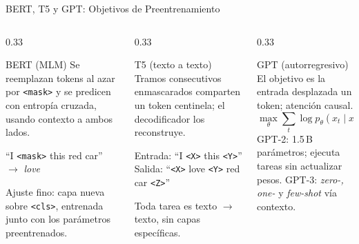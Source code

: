 \documentclass[aspectratio=169, 10pt]{beamer}
\begin{document}
\begin{frame}{BERT, T5 y GPT: Objetivos de Preentrenamiento}
	\begin{columns}[T]
		\begin{column}{0.33\textwidth}
			\begin{block}{BERT (MLM)}
				\scriptsize
				Se reemplazan tokens al azar por \texttt{<mask>} y se predicen con entrop\'ia cruzada, usando contexto a ambos lados.

				\medskip
				``I \texttt{<mask>} this red car'' $\to$ \emph{love}

				\medskip
				Ajuste fino: capa nueva sobre \texttt{<cls>}, entrenada junto con los par\'ametros preentrenados.
			\end{block}
		\end{column}
		\begin{column}{0.33\textwidth}
			\begin{block}{T5 (texto a texto)}
				\scriptsize
				Tramos consecutivos enmascarados comparten un token centinela; el decodificador los reconstruye.

				\medskip
				Entrada: ``I \texttt{<X>} this \texttt{<Y>}''\\
				Salida: ``\texttt{<X>} love \texttt{<Y>} red car \texttt{<Z>}''

				\medskip
				Toda tarea es texto $\to$ texto, sin capas espec\'ificas.
			\end{block}
		\end{column}
		\begin{column}{0.33\textwidth}
			\begin{block}{GPT (autorregresivo)}
				\scriptsize
				El objetivo es la entrada desplazada un token; atenci\'on causal.
				\[
				\max_\theta \sum_t \log p_\theta(x_t\mid x_{<t})
				\]
				GPT-2: 1.5\,B par\'ametros; ejecuta tareas sin actualizar pesos. GPT-3: \emph{zero-, one-} y \emph{few-shot} v\'ia contexto.
			\end{block}
		\end{column}
	\end{columns}
\end{frame}
\end{document}

